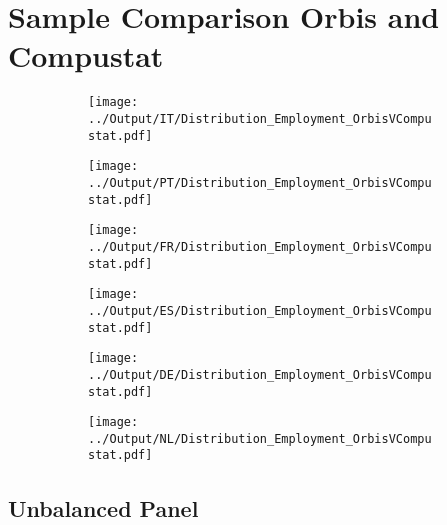 \documentclass[12pt,notitlepage]{article}
\begin{document}
\section{Sample Comparison Orbis and Compustat} %
\label{sec:compustat_vs_orbis}
\FloatBarrier

\begin{figure}[!htpb]
\centering
\caption*{Employment Distribution: Orbis vs Compustat}
\begin{subfigure}{.49\textwidth}
    \centering
 \texttt{[image: ../Output/IT/Distribution\_Employment\_OrbisVCompustat.pdf]}
\end{subfigure}%
\begin{subfigure}{.49\textwidth}
    \centering
 \texttt{[image: ../Output/PT/Distribution\_Employment\_OrbisVCompustat.pdf]}
\end{subfigure}
\begin{subfigure}{.49\textwidth}
    \centering
 \texttt{[image: ../Output/FR/Distribution\_Employment\_OrbisVCompustat.pdf]}
\end{subfigure}%
\begin{subfigure}{.49\textwidth}
    \centering
 \texttt{[image: ../Output/ES/Distribution\_Employment\_OrbisVCompustat.pdf]}
\end{subfigure}
\begin{subfigure}{.49\textwidth}
    \centering
 \texttt{[image: ../Output/DE/Distribution\_Employment\_OrbisVCompustat.pdf]}
\end{subfigure}
\begin{subfigure}{.49\textwidth}
    \centering
 \texttt{[image: ../Output/NL/Distribution\_Employment\_OrbisVCompustat.pdf]}
\end{subfigure}
\end{figure}

\clearpage


\subsection{Unbalanced Panel}

\begin{table}[!htpb]
    \centering
    \caption{Italy}
\end{table}
\end{document}
